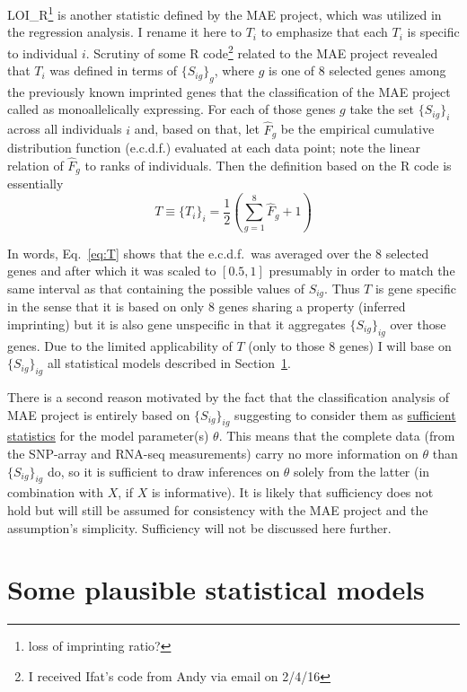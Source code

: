 \documentclass[letterpaper]{article}
\begin{document}
LOI\_R\footnote{loss of imprinting ratio?} is another statistic defined by the
MAE project, which was utilized in the regression analysis.  I rename it here
to \(T_i\) to emphasize that each \(T_i\) is specific to individual \(i\).
Scrutiny of some R code\footnote{I received Ifat's code from Andy via email on
2/4/16} related to the MAE project revealed that \(T_i\) was defined in terms
of \(\{S_{ig}\}_g\), where \(g\) is one of 8 selected genes among the
previously known imprinted genes that the classification of the MAE project
called as monoallelically expressing.  For each of those genes \(g\) take the
set \(\{S_{ig}\}_i\) across all individuals \(i\) and, based on that, let
\(\hat{F}_g\) be the empirical cumulative distribution function (e.c.d.f.)
evaluated at each data point; note the linear relation of \(\hat{F}_g\) to
ranks of individuals.  Then the definition based on the R code is essentially
\begin{equation}
\label{eq:T}
T \equiv \{T_i\}_i = \frac{1}{2}\left(\sum_{g=1}^8 \hat{F}_g + 1 \right)
\end{equation}

In words, Eq.~\ref{eq:T} shows that the e.c.d.f.~was averaged over the 8
selected genes and after which it was scaled to \([0.5,1]\) presumably in
order to match the same interval as that containing the possible values of
\(S_{ig}\).  Thus \(T\) is gene specific in the sense that it is based on only
8 genes sharing a property (inferred imprinting) but it is also gene
unspecific in that it aggregates \(\{S_{ig}\}_{ig}\) over those genes.  Due to
the limited applicability of \(T\) (only to those 8 genes) I will base on
$\{S_{ig}\}_{ig}$ all statistical models described in
Section~\ref{sec:models}.

There is a second reason motivated by the fact that the classification
analysis of MAE project is entirely based on $\{S_{ig}\}_{ig}$ suggesting to
consider them as
\href{https://en.wikipedia.org/wiki/Sufficient_statistic}{sufficient
statistics} for the model parameter(s) $\theta$.  This means that the complete
data (from the SNP-array and RNA-seq measurements) carry no more information
on $\theta$ than $\{S_{ig}\}_{ig}$ do, so it is sufficient to draw inferences
on \(\theta\) solely from the latter (in combination with $X$, if $X$ is
informative).  It is likely that sufficiency does not hold but will still be
assumed for consistency with the MAE project and the assumption's simplicity.
Sufficiency will not be discussed here further.

\section{Some plausible statistical models}
\label{sec:models}
\end{document}
